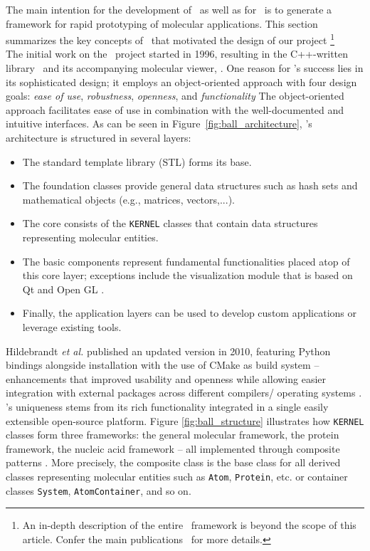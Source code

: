 The main intention for the development of \ball\ as well as for \biochem\ is to generate a framework for rapid prototyping of molecular applications. This section summarizes the key concepts of \ball\ that motivated the design of our project \footnote{An in-depth description of the entire \ball\ framework is beyond the scope of this article. Confer the main publications~\cite{kohlbacher_ballrapid_2000, hildebrandt_ball_2010}  for more details.}\\
The initial work on the \ball\ project started in 1996, resulting in the C++-written library \ball\ and its accompanying molecular viewer, \textit{\ballview}. One reason for \ball's success lies in its sophisticated design; it employs an object-oriented approach with four design goals: \textit{ease of use}, \textit{robustness}, \textit{openness}, and \textit{functionality }
The object-oriented approach facilitates ease of use in combination with the well-documented and intuitive interfaces. As can be seen in Figure~\ref{fig:ball_architecture}, \ball's architecture is structured in several layers:
\begin{itemize}
	
	\item The standard template library (STL) forms its base.
	\item The foundation classes provide general data structures such as hash sets and mathematical objects (e.g., matrices, vectors,...). 
	\item The core consists of the \texttt{KERNEL} classes that contain data structures representing molecular entities.
	
	\item  The basic components represent fundamental functionalities placed atop of this core layer; exceptions include the visualization module that is based on Qt and Open GL \cite{Qt5,OpenGLWebsite}.
	\item Finally, the application layers can be used to develop custom applications or leverage existing tools. \\
\end{itemize}
Hildebrandt \textit{et al.} published an updated version in 2010, featuring  Python bindings alongside installation with the use of CMake as build system -- enhancements that improved usability and openness while allowing easier integration with external packages across different compilers/ operating systems \cite{hildebrandt_ball_2010}. \\

\ball's uniqueness stems from its rich functionality integrated in a single easily extensible open-source platform. Figure \ref{fig:ball_structure} illustrates how \texttt{KERNEL} classes form three frameworks: the general molecular framework, the protein framework, the nucleic acid framework -- all implemented through composite patterns \cite{gamma1994design}. More precisely, the composite class is the base class for all derived classes representing molecular entities such as \texttt{Atom}, \texttt{Protein}, etc. or container classes \texttt{System}, \texttt{AtomContainer}, and so on. \\ 

